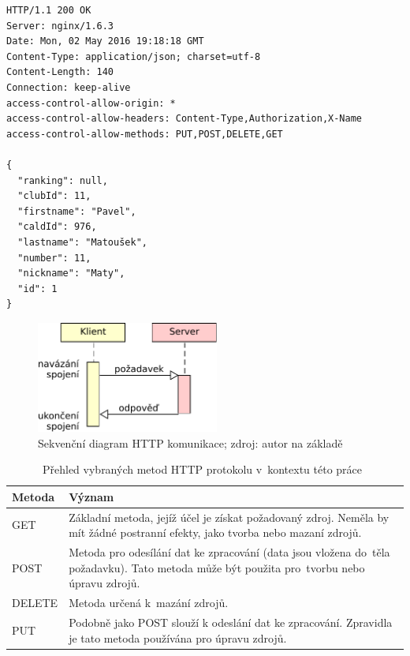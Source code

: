 \begingroup
\fontsize{9.5pt}{11pt}\selectfont
\begin{verbatim}
HTTP/1.1 200 OK
Server: nginx/1.6.3
Date: Mon, 02 May 2016 19:18:18 GMT
Content-Type: application/json; charset=utf-8
Content-Length: 140
Connection: keep-alive
access-control-allow-origin: *
access-control-allow-headers: Content-Type,Authorization,X-Name
access-control-allow-methods: PUT,POST,DELETE,GET

{
  "ranking": null,
  "clubId": 11,
  "firstname": "Pavel",
  "caldId": 976,
  "lastname": "Matoušek",
  "number": 11,
  "nickname": "Maty",
  "id": 1
}
\end{verbatim}
\endgroup

\begin{figure}[ht!]
  \centering
  \includegraphics[width=60mm]{./images/http-komunikace.pdf}
  \caption{Sekvenční diagram HTTP komunikace; zdroj: autor na základě~\cite{rest_vse}\label{overflow}}
\end{figure}

\begin{table}[ht!]
  \centering
  \begin{tabular}{|l|p{10.1cm}|}
    \hline
    \textbf{Metoda} & \textbf{Význam}\\
    \hline
    GET & Základní metoda, jejíž účel je získat požadovaný zdroj. Neměla by mít žádné postranní efekty, jako tvorba nebo mazaní zdrojů.\\
    \hline
    POST & Metoda pro odesílání dat ke zpracování (data jsou vložena do~těla požadavku). Tato metoda může být použita pro~tvorbu nebo úpravu zdrojů.\\
    \hline
    DELETE & Metoda určená k~mazání zdrojů.\\
    \hline
    PUT & Podobně jako POST slouží k odeslání dat ke zpracování. Zpravidla je tato metoda používána pro úpravu zdrojů.\\
    \hline
  \end{tabular}
  \caption{Přehled vybraných metod HTTP protokolu v~kontextu této práce~\cite{http_metody}}
  \label{tab:http_metody}
\end{table}

